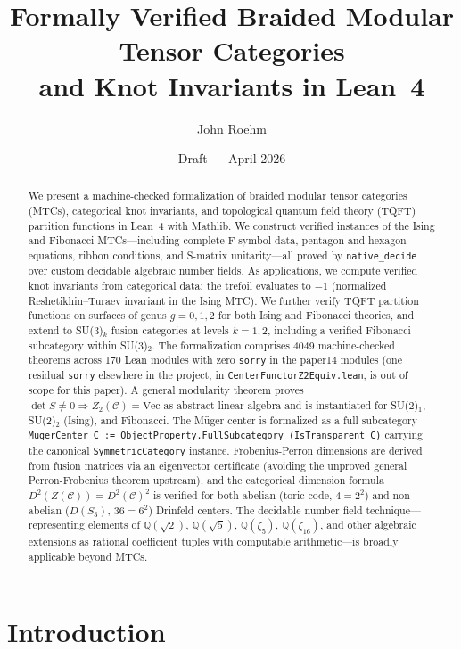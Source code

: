 \documentclass[12pt]{article}
\title{Formally Verified Braided Modular Tensor Categories\\and Knot Invariants in Lean~4}
\author{John Roehm}
\date{Draft --- April 2026}
\newcommand{\lean}[1]{\texttt{#1}}
\newcommand{\sorry}{\texttt{sorry}}
\newcommand{\nativedecide}{\texttt{native\_decide}}
\begin{document}
\maketitle

\begin{abstract}
We present a machine-checked formalization of braided modular tensor categories (MTCs), categorical knot invariants, and topological quantum field theory (TQFT) partition functions in Lean~4 with Mathlib. We construct verified instances of the Ising and Fibonacci MTCs---including complete F-symbol data, pentagon and hexagon equations, ribbon conditions, and S-matrix unitarity---all proved by \nativedecide{} over custom decidable algebraic number fields. As applications, we compute verified knot invariants from categorical data: the trefoil evaluates to $-1$ (normalized Reshetikhin--Turaev invariant in the Ising MTC). We further verify TQFT partition functions on surfaces of genus $g = 0, 1, 2$ for both Ising and Fibonacci theories, and extend to SU(3)$_k$ fusion categories at levels $k=1,2$, including a verified Fibonacci subcategory within SU(3)$_2$. The formalization comprises 4049 machine-checked theorems across 170 Lean modules with zero \sorry{} in the paper14 modules (one residual \sorry{} elsewhere in the project, in \lean{CenterFunctorZ2Equiv.lean}, is out of scope for this paper). A general modularity theorem proves $\det S \neq 0 \Rightarrow Z_2(\mathcal{C}) = \mathrm{Vec}$ as abstract linear algebra and is instantiated for SU(2)$_1$, SU(2)$_2$ (Ising), and Fibonacci. The Müger center is formalized as a full subcategory \texttt{MugerCenter C := ObjectProperty.FullSubcategory (IsTransparent C)} carrying the canonical \texttt{SymmetricCategory} instance. Frobenius-Perron dimensions are derived from fusion matrices via an eigenvector certificate (avoiding the unproved general Perron-Frobenius theorem upstream), and the categorical dimension formula $D^2(Z(\mathcal{C})) = D^2(\mathcal{C})^2$ is verified for both abelian (toric code, $4 = 2^2$) and non-abelian ($D(S_3)$, $36 = 6^2$) Drinfeld centers. The decidable number field technique---representing elements of $\mathbb{Q}(\sqrt{2})$, $\mathbb{Q}(\sqrt{5})$, $\mathbb{Q}(\zeta_5)$, $\mathbb{Q}(\zeta_{16})$, and other algebraic extensions as rational coefficient tuples with computable arithmetic---is broadly applicable beyond MTCs.
\end{abstract}

\section{Introduction}
\label{sec:intro}
\end{document}
